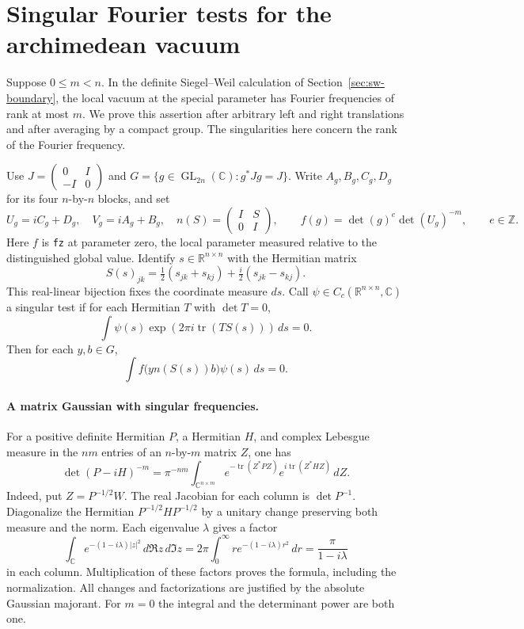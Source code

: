 \section{Singular Fourier tests for the archimedean vacuum}
\label{sec:sw-singular-vacuum}

Suppose \(0\le m<n\). In the definite Siegel--Weil calculation of
Section~\ref{sec:sw-boundary}, the local vacuum at the special
parameter has Fourier frequencies of rank at most \(m\). We prove
this assertion after arbitrary left and right translations and
after averaging by a compact group. The singularities here concern
the rank of the Fourier frequency.

Use \(J=\left(\begin{smallmatrix}0&I\\-I&0\end{smallmatrix}\right)\)
and \(G=\{g\in\operatorname{GL}_{2n}(\mathbb C):g^*Jg=J\}\).
Write \(A_g,B_g,C_g,D_g\) for its four \(n\)-by-\(n\) blocks, and set
\[
 U_g=iC_g+D_g,\quad V_g=iA_g+B_g,\quad
 n(S)=\begin{pmatrix}I&S\\0&I\end{pmatrix},\qquad
 f(g)=\det(g)^e\det(U_g)^{-m},\qquad e\in\mathbb Z.
\]
Here \(f\) is \texttt{fz} at parameter zero, the local parameter
measured relative to the distinguished global value. Identify
\(s\in\mathbb R^{n\times n}\) with the Hermitian matrix
\[
 S(s)_{jk}=\tfrac12(s_{jk}+s_{kj})+
                   \tfrac i2(s_{jk}-s_{kj}).
\]
This real-linear bijection fixes the coordinate measure \(ds\).
Call \(\psi\in C_c(\mathbb R^{n\times n},\mathbb C)\) a singular
test if for each Hermitian \(T\) with \(\det T=0\),
\[
       \int \psi(s)\exp(2\pi i\operatorname{tr}(T S(s)))\,ds=0 .
\]
Then for each \(y,b\in G\),
\begin{equation}
           \int f\bigl(y n(S(s)) b\bigr)\psi(s)\,ds=0.
 \label{eq:sw-singular-vacuum}
\end{equation}

\paragraph{A matrix Gaussian with singular frequencies.}
For a positive definite Hermitian \(P\), a Hermitian \(H\), and
complex Lebesgue measure in the \(nm\) entries of an
\(n\)-by-\(m\) matrix \(Z\), one has
\begin{equation}
 \det(P-iH)^{-m}
 =\pi^{-nm}\int_{\mathbb C^{n\times m}}
   e^{-\operatorname{tr}(Z^*PZ)}e^{i\operatorname{tr}(Z^*HZ)}\,dZ.
 \label{eq:sw-singular-gaussian}
\end{equation}
Indeed, put \(Z=P^{-1/2}W\). The real Jacobian for each column is
\(\det P^{-1}\). Diagonalize the Hermitian
\(P^{-1/2}HP^{-1/2}\) by a unitary change preserving both measure
and the norm. Each eigenvalue \(\lambda\) gives a factor
\[
 \int_{\mathbb C} e^{-(1-i\lambda)|z|^2}\,d\Re z\,d\Im z
       =2\pi\int_0^\infty r e^{-(1-i\lambda)r^2}\,dr
       =\frac{\pi}{1-i\lambda}
\]
in each column. Multiplication of these factors proves the
formula, including the normalization. All changes and factorizations
are justified by the absolute Gaussian majorant. For \(m=0\) the
integral and the determinant power are both one.

